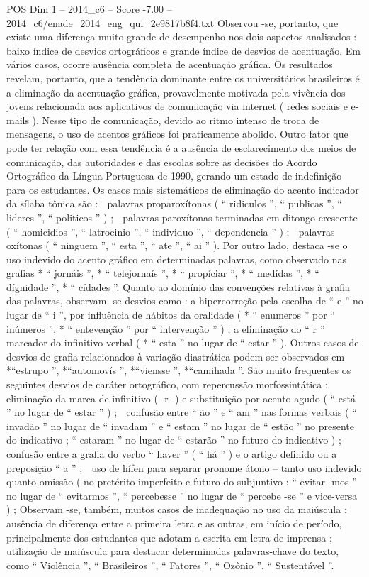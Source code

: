 \begin{textsample}{POS Dim 1 – 2014\_c6 – Score -7.00 – 2014\_c6/enade\_2014\_eng\_qui\_2e9817b8f4.txt}
Observou -se, portanto, que existe uma diferença muito grande de desempenho nos dois aspectos analisados : baixo índice de desvios ortográficos e grande índice de desvios de acentuação.
Em vários casos, ocorre ausência completa de acentuação gráfica.
Os resultados revelam, portanto, que a tendência dominante entre os universitários brasileiros é a eliminação da acentuação gráfica, provavelmente motivada pela vivência dos jovens relacionada aos aplicativos de comunicação via internet ( redes sociais e e-mails ).
Nesse tipo de comunicação, devido ao ritmo intenso de troca de mensagens, o uso de acentos gráficos foi praticamente abolido.
Outro fator que pode ter relação com essa tendência é a ausência de esclarecimento dos meios de comunicação, das autoridades e das escolas sobre as decisões do Acordo Ortográfico da Língua Portuguesa de 1990, gerando um estado de indefinição para os estudantes.
Os casos mais sistemáticos de eliminação do acento indicador da sílaba tônica são :  palavras proparoxítonas ( “ ridiculos ”, “ publicas ”, “ lideres ”, “ politicos ” ) ;  palavras paroxítonas terminadas em ditongo crescente ( “ homicidios ”, “ latrocinio ”, “ individuo ”, “ dependencia ” ) ;  palavras oxítonas ( “ ninguem ”, “ esta ”, “ ate ”, “ ai ” ).
Por outro lado, destaca -se o uso indevido do acento gráfico em determinadas palavras, como observado nas grafias * “ jornáis ”, * “ telejornaís ”, * “ propíciar ”, * “ medídas ”, * “ dígnidade ”, * “ cídades ”.
Quanto ao domínio das convenções relativas à grafia das palavras, observam -se desvios como : a hipercorreção pela escolha de “ e ” no lugar de “ i ”, por influência de hábitos da oralidade ( * “ enumeros ” por “ inúmeros ”, * “ entevenção ” por “ intervenção ” ) ; a eliminação do “ r ” marcador do infinitivo verbal ( * “ esta ” no lugar de “ estar ” ).
Outros casos de desvios de grafia relacionados à variação diastrática podem ser observados em *“estrupo ”, *“automovís ”, *“viensse ”, *“camihada ”.
São muito frequentes os seguintes desvios de caráter ortográfico, com repercussão morfossintática :  eliminação da marca de infinitivo ( -r- ) e substituição por acento agudo ( “ está ” no lugar de “ estar ” ) ;  confusão entre “ ão ” e “ am ” nas formas verbais ( “ invadão ” no lugar de “ invadam ” e “ estam ” no lugar de “ estão ” no presente do indicativo ; “ estaram ” no lugar de “ estarão ” no futuro do indicativo ) ;  confusão entre a grafia do verbo “ haver ” ( “ há ” ) e o artigo definido ou a preposição “ a ” ;  uso de hífen para separar pronome átono – tanto uso indevido quanto omissão ( no pretérito imperfeito e futuro do subjuntivo : “ evitar -mos ” no lugar de “ evitarmos ”, “ percebesse ” no lugar de “ percebe -se ” e vice-versa ) ; Observam -se, também, muitos casos de inadequação no uso da maiúscula : ausência de diferença entre a primeira letra e as outras, em início de período, principalmente dos estudantes que adotam a escrita em letra de imprensa ; utilização de maiúscula para destacar determinadas palavras-chave do texto, como “ Violência ”, “ Brasileiros ”, “ Fatores ”, “ Ozônio ”, “ Sustentável ”.

\end{textsample}
